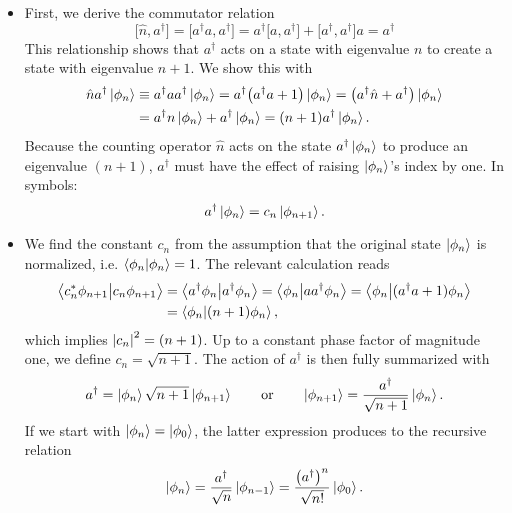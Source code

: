 \documentclass[11pt, a4paper]{article}
\newcommand{\eqtext}[1]{\qquad \text{#1} \qquad}
\newcommand{\bbraket}[2]{\big \langle {#1} \big | {#2} \big \rangle}  %
\renewcommand{\k}[1]{\ket{#1}}
\begin{document}
\begin{itemize}
	\item First, we derive the commutator relation
	\begin{equation*}
		\big[\hat{n}, a^{\dagger}\big] = \big[a^{\dagger} a, a^{\dagger}\big] = a^{\dagger}\big[a, a^{\dagger}\big] + \big[a^{\dagger}, a^{\dagger}\big]a = a^{\dagger}
	\end{equation*}
	This relationship shows that $ a^{\dagger} $ acts on a state with eigenvalue $ n $ to create a state with eigenvalue $ n + 1 $. We show this with
	\begin{align*}
		\hat{n}a^{\dagger}\k{\phi_{n}} &\equiv a^{\dagger} a a^{\dagger}\k{\phi_{n}} = a^{\dagger}\big(a^{\dagger}a + 1\big)\ket{\phi_{n}} = \big(a^{\dagger}\hat{n} + a^{\dagger}\big)\k{\phi_{n}}\\
		& = a^{\dagger}n \k{\phi_{n}} + a^{\dagger}\k{\phi_{n}} = (n + 1)a^{\dagger}\ket{\phi_{n}}.
	\end{align*}
	Because the counting operator $ \hat{n} $ acts on the state $ a^{\dagger}\ket{\phi_{n}} $ to produce an eigenvalue $ (n+1) $, $ a^{\dagger} $ must have the effect of raising $ \k{\phi_{n}} $'s index by one. In symbols:
	\begin{equation*}
		a^{\dagger} \k{\phi_{n}} = c_{n}\ket{\phi_{n + 1}}.
	\end{equation*}
	
	\item We find the constant $ c_{n} $ from the assumption that the original state $ \ket{\phi_{n}} $ is normalized, i.e. $ \braket{\phi_{n}}{\phi_{n}} = 1 $. The relevant calculation reads
	\begin{align*}
		\bbraket{c_{n}^{*}\phi_{n+1}}{c_{n}\phi_{n+1}} &= \bbraket{a^{\dagger}\phi_{n}}{a^{\dagger}\phi_{n}} = \bbraket{\phi_{n}}{aa^{\dagger}\phi_{n}} = \bbraket{\phi_{n}}{(a^{\dagger}a + 1)\phi_{n}} \\
		&= \braket{\phi_{n}}{(n + 1)\phi_{n}},
	\end{align*}
	which implies $ \abs{c_{n}}^{2} = (n+1) $. Up to a constant phase factor of magnitude one, we define $ c_{n} = \sqrt{n+1} $. The action of $ a^{\dagger} $ is then fully summarized with
	\begin{equation*}
		a^{\dagger} = \k{\phi_{n}} \sqrt{n+1}\ket{\phi_{n+1}} \eqtext{or} \ket{\phi_{n + 1}} = \frac{a^{\dagger}}{\sqrt{n+1}}\k{\phi_{n}}. 
	\end{equation*}
	If we start with $ \ket{\phi_{n}} = \ket{\phi_{0}} $, the latter expression produces to the recursive relation
	\begin{equation*}
		\ket{\phi_{n}} = \frac{a^{\dagger}}{\sqrt{n}}\ket{\phi_{n-1}} = \frac{\big(a^{\dagger}\big)^{n}}{\sqrt{n!}}\ket{\phi_{0}}.
	\end{equation*}
	

\end{itemize}
\end{document}
